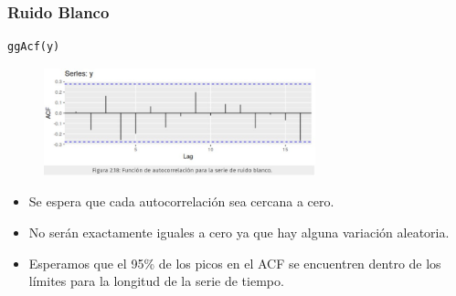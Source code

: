 \documentclass[10pt]{beamer}
\begin{document}
\begin{frame}[fragile]
\frametitle{Ruido Blanco}


\lstset{language=r,label= ,caption= ,captionpos=b,numbers=none}
\begin{lstlisting}
ggAcf(y)
\end{lstlisting}

\pause
\begin{figure}
\begin{center}
    \includegraphics[width=0.7\textwidth]{Imagen33.JPG}
\end{center}
\end{figure}

\begin{itemize}
\item Se espera que cada autocorrelación sea cercana a cero. 
\item No serán exactamente iguales a cero ya que hay alguna variación aleatoria. 
\item Esperamos que el 95\% de los picos en el ACF se encuentren dentro de los límites para la longitud de la serie de tiempo.
\end{itemize}



\end{frame}

































\end{document}
